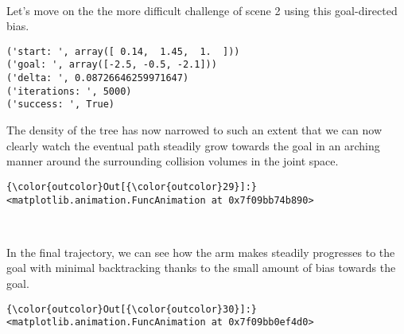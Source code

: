 \documentclass{article}
\begin{document}
    \begin{center}
    \end{center}
    { \hspace*{\fill} \\}
    
    Let's move on the the more difficult challenge of scene 2 using this
goal-directed bias.


    \begin{Verbatim}[commandchars=\\\{\}]
('start: ', array([ 0.14,  1.45,  1.  ]))
('goal: ', array([-2.5, -0.5, -2.1]))
('delta: ', 0.08726646259971647)
('iterations: ', 5000)
('success: ', True)
    \end{Verbatim}

    The density of the tree has now narrowed to such an extent that we can
now clearly watch the eventual path steadily grow towards the goal in an
arching manner around the surrounding collision volumes in the joint
space.



            \begin{Verbatim}[commandchars=\\\{\}]
{\color{outcolor}Out[{\color{outcolor}29}]:} <matplotlib.animation.FuncAnimation at 0x7f09bb74b890>
\end{Verbatim}
        
    \begin{center}
    \end{center}
    { \hspace*{\fill} \\}
    
    In the final trajectory, we can see how the arm makes steadily
progresses to the goal with minimal backtracking thanks to the small
amount of bias towards the goal.


            \begin{Verbatim}[commandchars=\\\{\}]
{\color{outcolor}Out[{\color{outcolor}30}]:} <matplotlib.animation.FuncAnimation at 0x7f09bb0ef4d0>
\end{Verbatim}
        
    \begin{center}
    \end{center}
    { \hspace*{\fill} \\}
    
\end{document}
